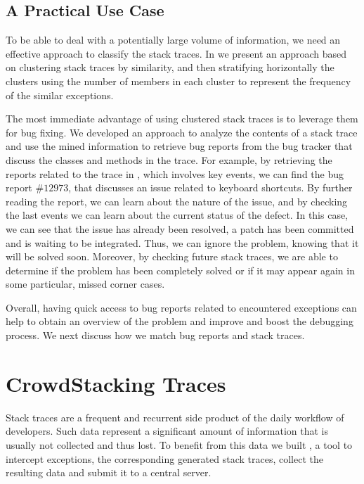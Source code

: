 \subsection{A Practical Use Case}

To be able to deal with a potentially large volume of information, we need an effective approach to classify the stack traces.
In  we present an approach based on clustering stack traces by similarity, and then stratifying horizontally the clusters using the number of members in each cluster to represent the frequency of the similar exceptions.

The most immediate advantage of using clustered stack traces is to leverage them for bug fixing.
We developed an approach to analyze the contents of a stack trace and use the mined information to retrieve bug reports from the \pha bug tracker that discuss the classes and methods in the trace.
For example, by retrieving the reports related to the trace in , which involves key events, we can find the bug report $\#12973$, that discusses an issue related to keyboard shortcuts.
By further reading the report, we can learn about the nature of the issue, and by checking the last events we can learn about the current status of the defect.
In this case, we can see that the issue has already been resolved, a patch has been committed and is waiting to be integrated.
Thus, we can ignore the problem, knowing that it will be solved soon.
Moreover, by checking future stack traces, we are able to determine if the problem has been completely solved or if it may appear again in some particular, missed corner cases.

Overall, having quick access to bug reports related to encountered exceptions can help to obtain an overview of the problem and improve and boost the debugging process.
We next discuss how we match bug reports and stack traces.


\section{CrowdStacking Traces}\label{sec:stacktraces-dataset}

Stack traces are a frequent and recurrent side product of the daily workflow of developers.
Such data represent a significant amount of information that is usually not collected and thus lost.
To benefit from this data we built \slr, a tool to intercept exceptions, the corresponding generated stack traces, collect the resulting data and submit it to a central server.


